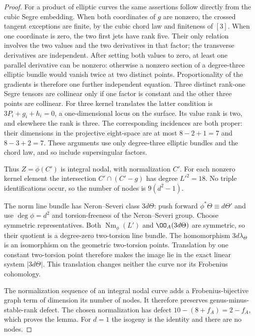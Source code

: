 \begin{proof}
For a product of elliptic curves the same assertions follow directly
from the cubic Segre embedding.  When both coordinates of $g$ are
nonzero, the crossed tangent exceptions are finite, by the cubic chord
law and finiteness of $[3]$.  When one coordinate is zero, the two first
jets have rank five.  Their only relation involves the two values and
the two derivatives in that factor; the transverse derivatives are
independent.  After setting both values to zero, at least one parallel
derivative can be nonzero: otherwise a nonzero section of a degree-three
elliptic bundle would vanish twice at two distinct points.  Proportionality
of the gradients is therefore one further independent equation.
Three distinct rank-one Segre tensors are collinear only if one factor
is constant and the other three points are collinear.  For three kernel
translates the latter condition is $3P_i+g_i+h_i=0$, a
one-dimensional locus on the surface.  Its value rank is two, and
elsewhere the rank is three.  The corresponding incidences are both
proper: their dimensions in the projective eight-space are at most
$8-2+1=7$ and $8-3+2=7$.  These arguments use only degree-three elliptic
bundles and the chord law, and so include supersingular factors.

Thus $Z=\phi(C')$ is integral nodal, with normalization $C'$.
For each nonzero kernel element the intersection
$C'\cap(C'-g)$ has degree $L'^2=18$.  No triple identifications
occur, so the number of nodes is $9(d^2-1)$.

The norm line bundle has Neron--Severi class $3d\Theta$:
push forward $\phi^*\Theta\equiv d\Theta'$ and use
$\deg\phi=d^2$ and torsion-freeness of the Neron--Severi group.
Choose symmetric representatives.  Both
$\operatorname{Nm}_\phi(L')$ and $\OO_A(3d\Theta)$ are symmetric,
so their quotient is a degree-zero two-torsion line bundle.
The homomorphism $3d\lambda_\Theta$ is an isomorphism on the geometric
two-torsion points.  Translation by one constant two-torsion point
therefore makes the image lie in the exact linear system $|3d\Theta|$.
This translation changes neither the curve nor its Frobenius cohomology.

The normalization sequence of an integral nodal curve adds a
Frobenius-bijective graph term of dimension its number of nodes.
It therefore preserves genus-minus-stable-rank defect.  The chosen
normalization has defect $10-(8+f_A)=2-f_A$, which proves the lemma.
For $d=1$ the isogeny is the identity and there are no nodes.
\end{proof}

